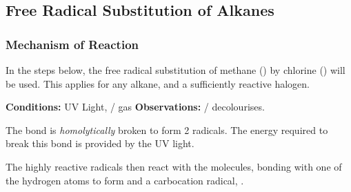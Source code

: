 		\subsection{Free Radical Substitution of Alkanes}

		\subsubsection{Mechanism of Reaction}

			In the steps below, the free radical substitution of methane () by chlorine () will be used. This applies
			for any alkane, and a sufficiently reactive halogen.

			\vspace{1.5em}

			\vbox{\textbf{Conditions:}	\tabto{35mm}UV Light,  /  gas}	%
			\vbox{\textbf{Observations:}\tabto{35mm}  /   decolourises.}


				The \ch{\chlorine-\chlorine} bond is \textit{homolytically} broken to form 2 \ch{\chlorine} radicals.
				The energy required to break this bond is provided by the UV light.




				The highly reactive \ch{\chlorine} radicals then react with the  molecules, bonding with one of the
				hydrogen atoms to form  and a carbocation radical, .


